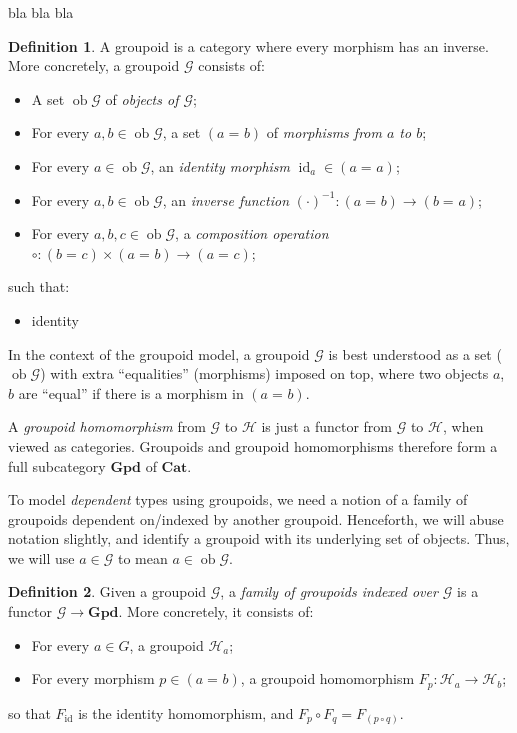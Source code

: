 \documentclass{article}
\theoremstyle{definition}
\newtheorem{definition}{Definition}[section]
\newcommand{\Gpd}{\mathbf{Gpd}}
\newcommand{\Cat}{\mathbf{Cat}}
\newcommand{\G}{\mathcal{G}}
\newcommand{\Hh}{\mathcal{H}}
\DeclareMathOperator{\ob}{ob}
\renewcommand{\hom}[3][]{(#2 =_{#1} #3)}
\newcommand{\inv}[1]{#1^{-1}}
\DeclareMathOperator{\id}{id}				    %
\begin{document}
{\color{red} bla bla bla}

\begin{definition}
    A groupoid is a category where every morphism has an inverse. More concretely, a groupoid $\G$ consists of:
    \begin{itemize}
        \item A set $\ob\G$ of \textit{objects of $\G$};
        
        \item For every $a, b \in \ob\G$, a set $\hom{a}{b}$ of \textit{morphisms from $a$ to $b$};
        
        \item For every $a \in \ob\G$, an \textit{identity morphism} $\id_a \in \hom{a}{a}$;
        
        \item For every $a, b \in \ob\G$, an \textit{inverse function} $\inv{(\cdot)}\colon \hom{a}{b} \to \hom{b}{a}$;
        
        \item For every $a, b, c \in \ob\G$, a \textit{composition operation} $\circ\colon \hom{b}{c} \times \hom{a}{b} \to \hom{a}{c}$;
    \end{itemize}
    such that:
    \begin{itemize}
        \item {\color{red} identity}
    \end{itemize}
\end{definition}

In the context of the groupoid model, a groupoid $\G$ is best understood as a set ($\ob \G$) with extra ``equalities'' (morphisms) imposed on top, where two objects $a$, $b$ are ``equal'' if there is a morphism in $\hom{a}{b}$.

A \textit{groupoid homomorphism} from $\G$ to $\Hh$ is just a functor from $\G$ to $\Hh$, when viewed as categories. Groupoids and groupoid homomorphisms therefore form a full subcategory $\Gpd$ of $\Cat$.

To model \textit{dependent} types using groupoids, we need a notion of a family of groupoids dependent on/indexed by another groupoid. Henceforth, we will abuse notation slightly, and identify a groupoid with its underlying set of objects. Thus, we will use $a \in \G$ to mean $a \in \ob\G$.

\begin{definition}
    Given a groupoid $\G$, a \textit{family of groupoids indexed over $\G$} is a functor $\G \to \Gpd$. More concretely, it consists of:
    \begin{itemize}
        \item For every $a \in G$, a groupoid $\Hh_a$;
        
        \item For every morphism $p \in \hom{a}{b}$, a groupoid homomorphism $F_p\colon \Hh_a \to \Hh_b$;
    \end{itemize}
    so that $F_{\id}$ is the identity homomorphism, and $F_p \circ F_q = F_{(p \circ q)}$.
\end{definition}
\end{document}
